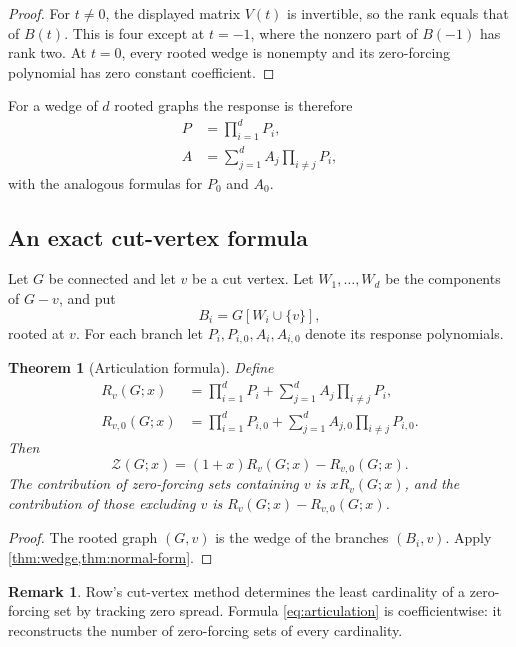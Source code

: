 \documentclass[11pt,reqno]{amsart}
\newtheorem{theorem}{Theorem}[section]
\theoremstyle{definition}
\newtheorem{remark}[remark]{Remark}
\newcommand{\Zpoly}{\mathcal Z}
\begin{document}
\begin{proof}
For $t\ne0$, the displayed matrix $V(t)$ is invertible, so the rank equals that
of $B(t)$.  This is four except at $t=-1$, where the nonzero part of $B(-1)$
has rank two.  At $t=0$, every rooted wedge is nonempty and its zero-forcing
polynomial has zero constant coefficient.
\end{proof}

For a wedge of $d$ rooted graphs the response is therefore
\begin{align}
  P&=\prod_{i=1}^dP_i,\label{eq:dpassive}\\
  A&=\sum_{j=1}^d A_j\prod_{i\ne j}P_i,\label{eq:dactive}
\end{align}
with the analogous formulas for $P_0$ and $A_0$.

\subsection{An exact cut-vertex formula}

Let $G$ be connected and let $v$ be a cut vertex.  Let $W_1,\dots,W_d$ be the components of $G-v$, and put
\[
  B_i=G[W_i\cup\{v\}],
\]
rooted at $v$.  For each branch let $P_i,P_{i,0},A_i,A_{i,0}$ denote its response polynomials.

\begin{theorem}[Articulation formula]\label{thm:articulation}
Define
\begin{align*}
  R_v(G;x)
  &=\prod_{i=1}^dP_i
    +\sum_{j=1}^dA_j\prod_{i\ne j}P_i,\\
  R_{v,0}(G;x)
  &=\prod_{i=1}^dP_{i,0}
    +\sum_{j=1}^dA_{j,0}\prod_{i\ne j}P_{i,0}.
\end{align*}
Then
\begin{equation}\label{eq:articulation}
  \boxed{
  \Zpoly(G;x)=(1+x)R_v(G;x)-R_{v,0}(G;x).
  }
\end{equation}
The contribution of zero-forcing sets containing $v$ is $xR_v(G;x)$, and the contribution of those excluding $v$ is $R_v(G;x)-R_{v,0}(G;x)$.
\end{theorem}

\begin{proof}
The rooted graph $(G,v)$ is the wedge of the branches $(B_i,v)$.  Apply \cref{thm:wedge,thm:normal-form}.
\end{proof}

\begin{remark}
Row's cut-vertex method \cite{Row2012} determines the least cardinality of a zero-forcing set by tracking zero spread.  Formula \eqref{eq:articulation} is coefficientwise: it reconstructs the number of zero-forcing sets of every cardinality.
\end{remark}
\end{document}

